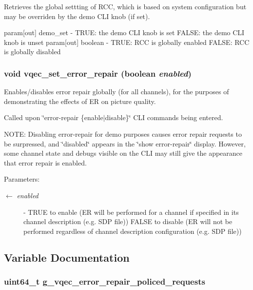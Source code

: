 Retrieves the global settting of RCC, which is based on system configuration but may be overriden by the demo CLI knob (if set).

param[out] demo\_\-set - TRUE: the demo CLI knob is set FALSE: the demo CLI knob is unset param[out] boolean - TRUE: RCC is globally enabled FALSE: RCC is globally disabled 
\subsubsection{\setlength{\rightskip}{0pt plus 5cm}void vqec\_\-set\_\-error\_\-repair (boolean {\em enabled})}\label{vqec__gap__reporter_8h_e00fa4263506be5328566209134943cb}


Enables/disables error repair globally (for all channels), for the purposes of demonstrating the effects of ER on picture quality.

Called upon \char`\"{}error-repair \{enable$|$disable\}\char`\"{} CLI commands being entered.

NOTE: Disabling error-repair for demo purposes causes error repair requests to be surpressed, and \char`\"{}disabled\char`\"{} appears in the \char`\"{}show error-repair\char`\"{} display. However, some channel state and debugs visible on the CLI may still give the appearance that error repair is enabled.

\begin{Desc}
\item[Parameters:]
\begin{description}
\item[\mbox{$\leftarrow$} {\em enabled}]- TRUE to enable (ER will be performed for a channel if specified in its channel description (e.g. SDP file)) FALSE to disable (ER will not be performed regardless of channel description configuration (e.g. SDP file)) \end{description}
\end{Desc}


\subsection{Variable Documentation}
\subsubsection{\setlength{\rightskip}{0pt plus 5cm}uint64\_\-t \bf{g\_\-vqec\_\-error\_\-repair\_\-policed\_\-requests}}\label{vqec__gap__reporter_8h_112f1305deac7db6409fbf819c32a0cb}


